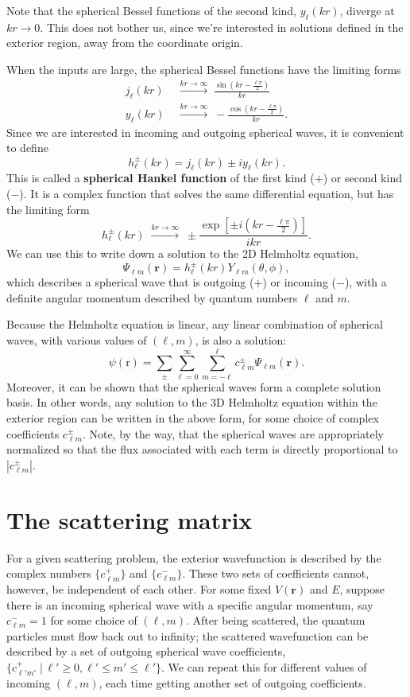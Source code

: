 \documentclass[pra,12pt]{revtex4}
\begin{document}
Note that the spherical Bessel functions of the second kind,
$y_\ell(kr)$, diverge at $kr\rightarrow 0$.  This does not bother us,
since we're interested in solutions defined in the exterior region,
away from the coordinate origin.

When the inputs are large, the spherical Bessel functions have the
limiting forms
$$\begin{aligned}j_\ell(kr)\; &\overset{kr\rightarrow\infty}{\longrightarrow} \; \frac{\sin(kr-\frac{\ell\pi}{2})}{kr} \\ y_\ell(kr)\; &\overset{kr\rightarrow\infty}{\longrightarrow} \; - \frac{\cos(kr-\frac{\ell\pi}{2})}{kr}.\end{aligned}$$
Since we are interested in incoming and outgoing spherical waves, it
is convenient to define
$$h_\ell^\pm(kr) = j_\ell(kr) \pm i y_\ell(kr).$$
This is called a \textbf{spherical Hankel function} of the first kind
($+$) or second kind ($-$).  It is a complex function that solves the
same differential equation, but has the limiting form
$$h_\ell^\pm(kr)\; \overset{kr\rightarrow\infty}{\longrightarrow} \; \pm \frac{\exp\left[\pm i(kr-\frac{\ell\pi}{2})\right]}{ikr}.$$
We can use this to write down a solution to the 2D Helmholtz equation,
$$\Psi_{\ell m}(\mathbf{r}) = h_{\ell}^\pm(kr) Y_{\ell m}(\theta,\phi),$$
which describes a spherical wave that is outgoing ($+$) or incoming
($-$), with a definite angular momentum described by quantum numbers
$\ell$ and $m$.

Because the Helmholtz equation is linear, any linear combination of
spherical waves, with various values of $(\ell,m)$, is also a solution:
$$\psi(\mathrm{r}) = \sum_\pm \sum_{\ell = 0}^\infty \sum_{m = - \ell}^\ell c_{\ell m}^\pm \Psi_{\ell m}(\mathbf{r}).$$
Moreover, it can be shown that the spherical waves form a complete
solution basis.  In other words, any solution to the 3D Helmholtz
equation within the exterior region can be written in the above form,
for some choice of complex coefficients $c_{\ell m}^\pm$.  Note, by
the way, that the spherical waves are appropriately normalized so that
the flux associated with each term is directly proportional to
$|c_{\ell m}^\pm|$.

\section{The scattering matrix}

For a given scattering problem, the exterior wavefunction is described
by the complex numbers $\{c_{\ell m}^+\}$ and $\{c_{\ell m}^-\}$.
These two sets of coefficients cannot, however, be independent of each
other.  For some fixed $V(\mathbf{r})$ and $E$, suppose there is an
incoming spherical wave with a specific angular momentum, say $c_{\ell
  m}^- = 1$ for some choice of $(\ell,m)$.  After being scattered, the
quantum particles must flow back out to infinity; the scattered
wavefunction can be described by a set of outgoing spherical wave
coefficients, $\{c_{\ell' m'}^+\;|\, \ell' \ge 0, \ell' \le m' \le
\ell'\}$.  We can repeat this for different values of incoming
$(\ell,m)$, each time getting another set of outgoing coefficients.
\end{document}
